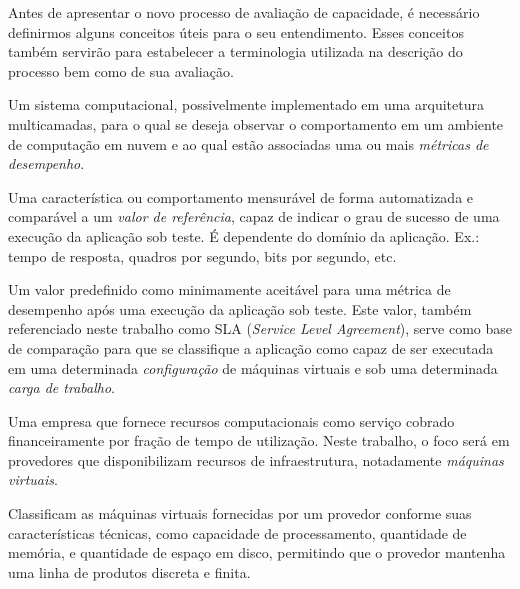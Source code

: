 \documentclass[12pt]{article}
\begin{document}
Antes de apresentar o novo processo de avaliação de capacidade, é necessário definirmos alguns conceitos úteis para o seu entendimento. Esses conceitos também servirão para estabelecer a terminologia utilizada na descrição do processo bem como de sua avaliação.


\begin{description}

\smallskip
\item[\em Aplicação sob teste] 
Um sistema computacional, possivelmente implementado em uma arquitetura multicamadas, para o qual se deseja observar o comportamento em um ambiente de computação em nuvem e ao qual estão associadas uma ou mais {\em métricas de 
desempenho}.

\item[\em Métrica de desempenho] 
Uma característica ou comportamento mensurável de forma automatizada e comparável a um {\em valor de referência}, capaz de indicar o grau de sucesso de uma execução da aplicação sob teste. É dependente do domínio da aplicação. Ex.: tempo de resposta, quadros por segundo, bits por segundo, etc.

\item[\em Valor de referência (SLA)] 
Um valor predefinido como minimamente aceitável  para uma métrica de desempenho após uma execução da aplicação sob teste. Este valor, também referenciado neste trabalho como SLA (\emph{Service Level Agreement}), serve como base de comparação para que se classifique a aplicação como capaz de ser executada em uma determinada {\em configuração} de máquinas virtuais e sob uma determinada {\em carga de trabalho}.

\item[\em Provedor]
Uma empresa que fornece recursos computacionais como serviço cobrado financeiramente por fração de tempo de utilização. Neste trabalho, o foco será em provedores que disponibilizam recursos de infraestrutura, notadamente {\em máquinas virtuais}.

\item[\em Tipos de máquinas virtuais]
Classificam as máquinas virtuais fornecidas por um provedor conforme suas características técnicas, como capacidade de processamento, quantidade de memória, e quantidade de espaço em disco, permitindo que o provedor mantenha uma linha de produtos discreta e finita.


\end{description}
\end{document}
